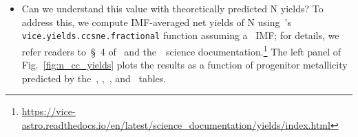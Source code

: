 \documentclass[ms.tex]{subfiles}
\begin{document}
\begin{itemize}
	\item Can we understand this value with theoretically predicted N yields? 
	To address this, we compute IMF-averaged net yields of N using~\vice's 
	\texttt{vice.yields.ccsne.fractional} function assuming 
	a~\citet{Kroupa2001} IMF; for details, we refer readers to~\S~4 
	of~\citet{Griffith2021} and the~\vice~science documentation.\footnote{
		\url{https://vice-astro.readthedocs.io/en/latest/science_documentation/yields/index.html} 
	} 
	The left panel of Fig.~\ref{fig:n_cc_yields} plots the results as a 
	function of progenitor metallicity predicted by the~\citet{Woosley1995}, 
	\citet{Nomoto2013},~\citet{Sukhbold2016}, and~\citet{Limongi2018} tables. 




\end{itemize}
\end{document}
